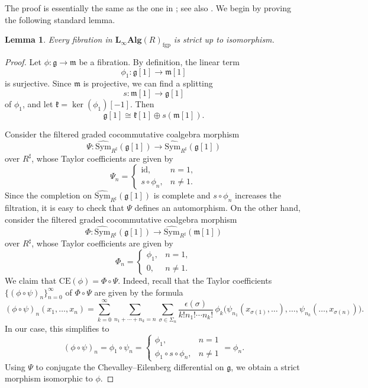 \documentclass[12pt]{amsart}
\newtheorem{lem}[defn]{Lemma}
\numberwithin{equation}{section}
\theoremstyle{plain}
\newcommand{\fg}{\mathfrak{g}}
\newcommand{\fk}{\mathfrak{k}}
\newcommand{\fm}{\mathfrak{m}}
\newcommand{\Sym}{\mathrm{Sym}}
\newcommand{\CE}{\mathrm{CE}}
\newcommand{\id}{\mathrm{id}}
\newcommand{\wSym}{\widehat{\Sym}}
\newcommand{\uR}{{R^\sharp}}
\begin{document}
	The proof is essentially the same as the one in \cite{getzler2025higherholonomycurvedlinftyalgebras}; see also \cite{rogers2020explicit}. We begin by proving the following standard lemma.
	
	\begin{lem}\label{fibstr}
		Every fibration in $\mathbf{L_\infty Alg}(R)_{\mathrm{fgp}}$ is strict up to isomorphism.
	\end{lem}
	
	\begin{proof}
		Let $\phi \colon \fg \to \fm$ be a fibration. By definition, the linear term
		\[
		\phi_1 \colon \fg[1] \to \fm[1]
		\]
		is surjective. Since $\fm$ is projective, we can find a splitting
		\[
		s \colon \fm[1] \to \fg[1]
		\]
		of $\phi_1$, and let $\fk = \ker(\phi_1)[-1]$. Then
		\[
		\fg[1] \cong \fk[1] \oplus s(\fm[1]).
		\]
		
		Consider the filtered graded cocommutative coalgebra morphism
		\[
		\Psi \colon \wSym_\uR(\fg[1]) \to \wSym_\uR(\fg[1])
		\]
		over $\uR$, whose Taylor coefficients are given by
		\[
		\Psi_n = \begin{cases}
			\id, & n=1, \\
			s \circ \phi_n, & n \neq 1.
		\end{cases}
		\]
		Since the completion on $\wSym_\uR(\fg[1])$ is complete and $s \circ \phi_n$ increases the filtration, it is easy to check that $\Psi$ defines an automorphism. On the other hand, consider the filtered graded cocommutative coalgebra morphism
		\[
		\Phi\colon \wSym_\uR(\fg[1]) \to \wSym_\uR(\fm[1])
		\]
		over $\uR$, whose Taylor coefficients are given by
		\[
		\Phi_n = \begin{cases}
			\phi_1, & n=1,\\
			0, & n \neq 1.
		\end{cases}
		\]
		We claim that $\CE(\phi) =  \Phi \circ \Psi$. Indeed, recall that the Taylor coefficients $\{(\phi \circ \psi)_n\}_{n=0}^\infty$ of $\Phi \circ \Psi$ are given by the formula
		\[
		(\phi \circ \psi)_n(x_1, \dots, x_n)
		=
		\sum_{k=0}^{\infty}
		\sum_{n_1 + \cdots + n_k = n}
		\sum_{\sigma \in \Sigma_n}
		\frac{\epsilon(\sigma)}{k!n_1! \cdots n_k!}
		\, \phi_k\!\Big(
		\psi_{n_1}(x_{\sigma(1)}, \dots), \dots, \psi_{n_k}(\dots, x_{\sigma(n)})
		\Big).
		\]
		In our case, this simplifies to
		\[
		(\phi \circ \psi)_n
		= \phi_1 \circ \psi_n
		= \begin{cases}
			\phi_1, & n=1\\
			\phi_1 \circ s \circ \phi_n, & n \neq 1
		\end{cases}
		= \phi_n.
		\]
		Using $\Psi$ to conjugate the Chevalley--Eilenberg differential on $\fg$, we obtain a strict morphism isomorphic to $\phi$.
	\end{proof}
	
\end{document}
